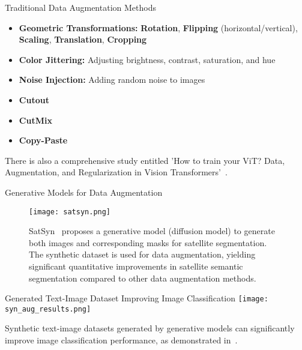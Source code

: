 \begin{refsection}
  \begin{frame}{Traditional Data Augmentation Methods}
    \begin{itemize}
      \item \textbf{Geometric Transformations:} \textbf{Rotation}, \textbf{Flipping} (horizontal/vertical), \textbf{Scaling}, \textbf{Translation}, \textbf{Cropping}
      \item \textbf{Color Jittering:} Adjusting brightness, contrast, saturation, and hue
      \item \textbf{Noise Injection:} Adding random noise to images
      \item \textbf{Cutout}~\parencite{devriesImprovedRegularizationConvolutional2017}
      \item \textbf{CutMix}~\parencite{yunCutMixRegularizationStrategy2019}
      \item \textbf{Copy-Paste}~\parencite{ghiasiSimpleCopyPasteStrong2021}
    \end{itemize}
    There is also a comprehensive study entitled 'How to train your ViT? Data, Augmentation,  and Regularization in Vision Transformers'~\parencite{steinerHowTrainYour2022}.
    \bottomleftrefs
  \end{frame}
\end{refsection}

\begin{refsection}
  \begin{frame}{Generative Models for Data Augmentation}
    \begin{figure}
      \centering
      \texttt{[image: satsyn.png]}
      
      \vspace{0.5em}
      \caption{\scriptsize SatSyn~\parencite{tokerSatSynthAugmentingImageMask2024} proposes a generative model (diffusion model) to generate both images and corresponding masks for satellite segmentation. The synthetic dataset is used for data augmentation, yielding significant quantitative improvements in satellite semantic segmentation compared to other data augmentation methods.}
    \end{figure}

    \bottomleftrefs
  \end{frame}
\end{refsection}

\begin{refsection}
  \begin{frame}{Generated Text-Image Dataset Improving Image Classification}
    \centering
    \texttt{[image: syn\_aug\_results.png]}
    
    
    \scriptsize
    Synthetic text-image datasets generated by generative models can significantly improve image classification performance, as demonstrated in~\parencite{heSYNTHETICDATAGENERATIVE2022}.
    \bottomleftrefs
  \end{frame}
\end{refsection}

